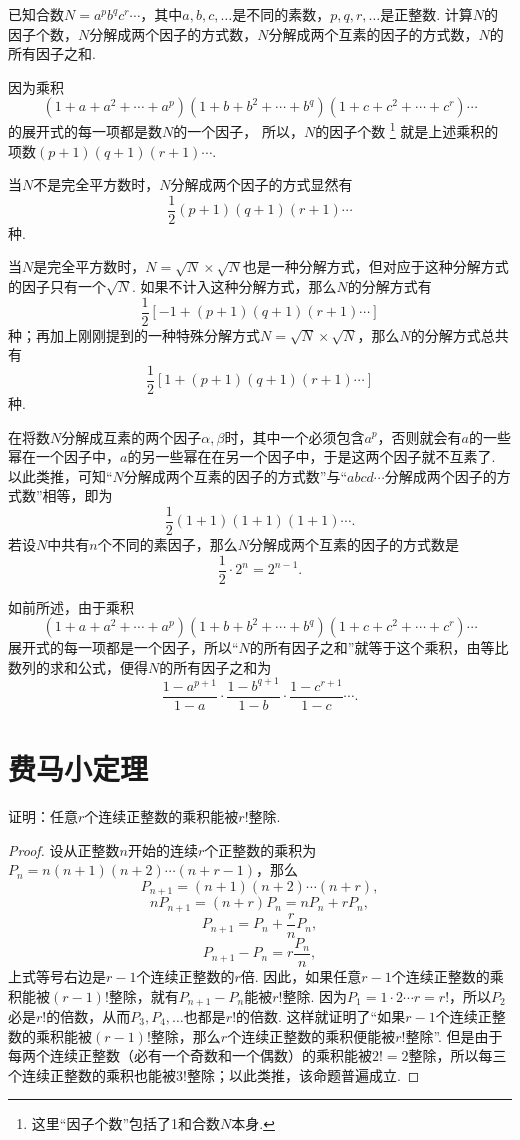 \begin{example}
已知合数\(N = a^p b^q c^r \dotsm\)，其中\(a,b,c,\dotsc\)是不同的素数，\(p,q,r,\dotsc\)是正整数.
计算\(N\)的因子个数，\(N\)分解成两个因子的方式数，\(N\)分解成两个互素的因子的方式数，\(N\)的所有因子之和.
\begin{solution}
因为乘积\[
(1+a+a^2+\dotsb+a^p)
(1+b+b^2+\dotsb+b^q)
(1+c+c^2+\dotsb+c^r)\dotsm
\]的展开式的每一项都是数\(N\)的一个因子，
所以，\(N\)的因子个数%
\footnote{这里“因子个数”包括了1和合数\(N\)本身.}%
就是上述乘积的项数\((p+1)(q+1)(r+1)\dotsm\).

当\(N\)不是完全平方数时，\(N\)分解成两个因子的方式显然有\[
\frac{1}{2} (p+1)(q+1)(r+1)\dotsm
\]种.

当\(N\)是完全平方数时，\(N = \sqrt{N}\times\sqrt{N}\)也是一种分解方式，但对应于这种分解方式的因子只有一个\(\sqrt{N}\).
如果不计入这种分解方式，那么\(N\)的分解方式有\[
\frac{1}{2} \left[-1 + (p+1)(q+1)(r+1)\dotsm\right]
\]种；再加上刚刚提到的一种特殊分解方式\(N = \sqrt{N}\times\sqrt{N}\)，那么\(N\)的分解方式总共有\[
\frac{1}{2} \left[1 + (p+1)(q+1)(r+1)\dotsm\right]
\]种.

在将数\(N\)分解成互素的两个因子\(\alpha,\beta\)时，其中一个必须包含\(a^p\)，否则就会有\(a\)的一些幂在一个因子中，\(a\)的另一些幂在在另一个因子中，于是这两个因子就不互素了.
以此类推，可知“\(N\)分解成两个互素的因子的方式数”与“\(abcd\dotsm\)分解成两个因子的方式数”相等，即为\[
\frac{1}{2}(1+1)(1+1)(1+1)\dotsm.
\]若设\(N\)中共有\(n\)个不同的素因子，那么\(N\)分解成两个互素的因子的方式数是\[
\frac{1}{2} \cdot 2^n = 2^{n-1}.
\]

如前所述，由于乘积\[
(1+a+a^2+\dotsb+a^p)
(1+b+b^2+\dotsb+b^q)
(1+c+c^2+\dotsb+c^r)\dotsm
\]展开式的每一项都是一个因子，所以“\(N\)的所有因子之和”就等于这个乘积，由等比数列的求和公式，便得\(N\)的所有因子之和为\[
\frac{1-a^{p+1}}{1-a}\cdot\frac{1-b^{q+1}}{1-b}\cdot\frac{1-c^{r+1}}{1-c}\dotsm.
\]
\end{solution}
\end{example}

\section{费马小定理}
\begin{lemma}\label{theorem:初等数论.费马小定理.引理0}
证明：任意\(r\)个连续正整数的乘积能被\(r!\)整除.
\begin{proof}
设从正整数\(n\)开始的连续\(r\)个正整数的乘积为\(P_n = n(n+1)(n+2)\dotsm(n+r-1)\)，那么\[
P_{n+1} = (n+1)(n+2)\dotsm(n+r),
\]\[
n P_{n+1} = (n+r) P_n = n P_n + r P_n,
\]\[
P_{n+1} = P_n + \frac{r}{n} P_n,
\]\[
P_{n+1} - P_n = r \frac{P_n}{n},
\]上式等号右边是\(r-1\)个连续正整数的\(r\)倍.
因此，如果任意\(r-1\)个连续正整数的乘积能被\((r-1)!\)整除，就有\(P_{n+1} - P_n\)能被\(r!\)整除.
因为\(P_1 = 1 \cdot 2 \dotsm r = r!\)，所以\(P_2\)必是\(r!\)的倍数，从而\(P_3,P_4,\dotsc\)也都是\(r!\)的倍数.
这样就证明了“如果\(r-1\)个连续正整数的乘积能被\((r-1)!\)整除，那么\(r\)个连续正整数的乘积便能被\(r!\)整除”.
但是由于每两个连续正整数（必有一个奇数和一个偶数）的乘积能被\(2!=2\)整除，所以每三个连续正整数的乘积也能被\(3!\)整除；以此类推，该命题普遍成立.
\end{proof}
\end{lemma}

